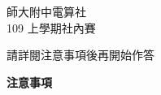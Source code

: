\documentclass[12pt]{article}
\begin{document}
\renewcommand{\headrulewidth}{0pt}
\cfoot{}
\lhead{}
\chead{}
\rhead{}

\begin{titlepage}
    \vspace*{\fill}
    \begin{center}
        \huge
        師大附中電算社\\
        109 上學期社內賽

        \vspace{50pt}
        \Large
        請詳閱注意事項後再開始作答
        \normalsize
    \end{center}
    \vspace*{\fill}
\end{titlepage}

\clearpage

\renewcommand{\headrulewidth}{1pt}
\setlength\parindent{24pt}
\setlength\parskip{12pt}
\cfoot{\thepage}

\noindent
\huge
\textbf{注意事項}
\normalsize
\end{document}
